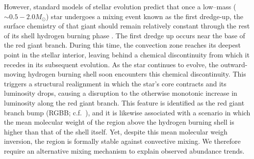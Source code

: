 However, standard models of stellar evolution predict that once a low--mass ($\sim 0.5 -2.0 M_{\odot}$) star undergoes a mixing event known as the first dredge-up, the surface chemistry of that giant should remain relatively constant through the rest of its shell hydrogen burning phase \citep[e.g][]{iben1964, Iben1967}. 
The first dredge up occurs near the base of the red giant branch. During this time, the convection zone reaches its deepest point in the stellar interior, leaving behind a chemical discontinuity from which it recedes in its subsequent evolution. %
As the star continues to evolve, the outward-moving hydrogen burning shell soon encounters this chemical discontinuity. 
This triggers a structural realignment in which the star's core contracts and its luminosity drops, causing a disruption to the otherwise monotonic increase in luminosity along the red giant branch. This feature is identified as the red giant branch bump (RGBB; c.f.\ \citealt{Joyce2015, Khan2018}), and it is likewise associated with a scenario in which the mean molecular weight of the region above the hydrogen burning shell is higher than that of the shell itself. Yet, despite this mean molecular weigh inversion, the region is formally stable against convective mixing. We therefore require an alternative mixing mechanism to explain observed abundance trends. 



